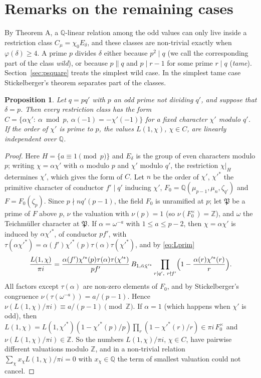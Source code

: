 \documentclass[11pt]{amsart}
\newtheorem{proposition}[theorem]{Proposition}
\theoremstyle{definition}
\theoremstyle{remark}
\providecommand{\Q}{\mathbb Q}
\providecommand{\Z}{\mathbb Z}
\newcommand{\fP}{\mathfrak P}
\numberwithin{equation}{section}
\begin{document}
\section{Remarks on the remaining cases}\label{sec:remarks}

By Theorem A, a $\Q$-linear relation among the odd values can only live inside a restriction class $C_\mu=\chi_0E_\delta$, and these classes are non-trivial exactly when $\varphi(\delta)\ge4$.
A prime $p$ divides $\delta$ either because $p^2\mid q$ (we call the corresponding part of the class \emph{wild}), or because $p\parallel q$ and $p\mid r-1$ for some prime $r\mid q$ (\emph{tame}).
Section~\ref{sec:psquare} treats the simplest wild case.
In the simplest tame case Stickelberger's theorem separates part of the classes.

\begin{proposition}\label{prop:tame}
Let $q=pq'$ with $p$ an odd prime not dividing $q'$, and suppose that $\delta=p$.
Then every restriction class has the form $C=\{\alpha\chi':\ \alpha\bmod p,\ \alpha(-1)=-\chi'(-1)\}$ for a fixed character $\chi'$ modulo $q'$.
If the order of $\chi'$ is prime to $p$, the values $L(1,\chi)$, $\chi\in C$, are linearly independent over $\Q$.
\end{proposition}

\begin{proof}
Here $H=\{a\equiv1\pmod p\}$ and $E_\delta$ is the group of even characters modulo $p$; writing $\chi=\alpha\chi'$ with $\alpha$ modulo $p$ and $\chi'$ modulo $q'$, the restriction $\chi|_H$ determines $\chi'$, which gives the form of $C$.
Let $n$ be the order of $\chi'$, $\chi'^*$ the primitive character of conductor $f'\mid q'$ inducing $\chi'$, $F_0=\Q(\mu_{p-1},\mu_n,\zeta_{q'})$ and $F=F_0(\zeta_p)$.
Since $p\nmid nq'(p-1)$, the field $F_0$ is unramified at $p$; let $\fP$ be a prime of $F$ above $p$, $\nu$ the valuation with $\nu(p)=1$ (so $\nu(F_0^\times)=\Z$), and $\omega$ the Teichm\"uller character at $\fP$.
If $\alpha=\omega^{-a}$ with $1\le a\le p-2$, then $\chi=\alpha\chi'$ is induced by $\alpha\chi'^*$, of conductor $pf'$, with $\tau(\alpha\chi'^*)=\alpha(f')\chi'^*(p)\tau(\alpha)\tau(\chi'^*)$, and by \eqref{eq:Lprim}
\[
\frac{L(1,\chi)}{\pi i}=\frac{\alpha(f')\chi'^*(p)\tau(\alpha)\tau(\chi'^*)}{pf'}\,B_{1,\bar\alpha\bar\chi'^*}\prod_{r\mid q',\ r\nmid f'}\Bigl(1-\frac{\alpha(r)\chi'^*(r)}r\Bigr).
\]
All factors except $\tau(\alpha)$ are non-zero elements of $F_0$, and by Stickelberger's congruence \cite[\S6.2]{Was97} $\nu(\tau(\omega^{-a}))=a/(p-1)$.
Hence $\nu(L(1,\chi)/\pi i)\equiv a/(p-1)\pmod\Z$.
If $\alpha=1$ (which happens when $\chi'$ is odd), then $L(1,\chi)=L(1,\chi'^*)(1-\chi'^*(p)/p)\prod_{r}(1-\chi'^*(r)/r)\in\pi i\,F_0^\times$ and $\nu(L(1,\chi)/\pi i)\in\Z$.
So the numbers $L(1,\chi)/\pi i$, $\chi\in C$, have pairwise different valuations modulo $\Z$, and in a non-trivial relation $\sum_\chi x_\chi L(1,\chi)/\pi i=0$ with $x_\chi\in\Q$ the term of smallest valuation could not cancel.
\end{proof}
\end{document}
